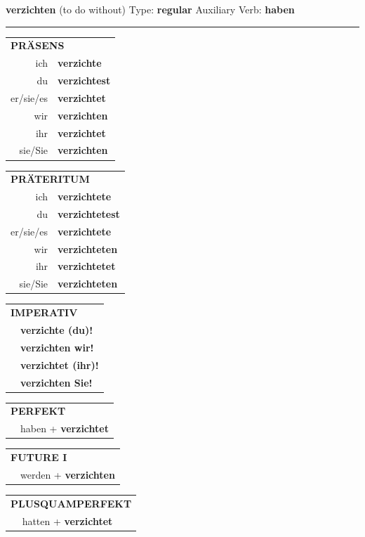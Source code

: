 \documentclass[10pt,a4paper]{revtex4-2}
\begin{document}
\begin{verbbox}
{\Large \bf verzichten} (to do without) \hfill Type: \textbf{regular} \hfill Auxiliary Verb: \textbf{haben}

\vspace{5pt}
\hrule
\vspace{5pt}

\begin{tabular}{rl}
\multicolumn{2}{l}{\textbf{PRÄSENS}}\\
ich & \textbf{verzichte}\\
du & \textbf{verzichtest}\\
er/sie/es & \textbf{verzichtet}\\
wir & \textbf{verzichten}\\
ihr & \textbf{verzichtet}\\
sie/Sie & \textbf{verzichten}\\
\end{tabular}
\hfill
\begin{tabular}{rl}
\multicolumn{2}{l}{\textbf{PRÄTERITUM}}\\
ich & \textbf{verzichtete}\\
du & \textbf{verzichtetest}\\
er/sie/es & \textbf{verzichtete}\\
wir & \textbf{verzichteten}\\
ihr & \textbf{verzichtetet}\\
sie/Sie & \textbf{verzichteten}\\
\end{tabular}
\hfill
\begin{tabular}{rl}
\multicolumn{2}{l}{\textbf{IMPERATIV}}\\
& \textbf{verzichte (du)!}\\
& \textbf{verzichten wir!}\\
& \textbf{verzichtet (ihr)!}\\
& \textbf{verzichten Sie!}\\
\end{tabular}

\vspace{10pt}

\begin{tabular}{rl}
\multicolumn{2}{l}{\textbf{PERFEKT}}\\
& haben + \textbf{verzichtet}\\
\end{tabular}
\hfill
\begin{tabular}{rl}
\multicolumn{2}{l}{\textbf{FUTURE I}}\\
& werden + \textbf{verzichten}\\
\end{tabular}
\hfill
\begin{tabular}{rl}
\multicolumn{2}{l}{\textbf{PLUSQUAMPERFEKT}}\\
& hatten + \textbf{verzichtet}\\
\end{tabular}


\end{verbbox}
\end{document}
